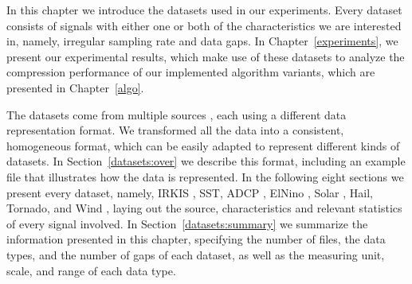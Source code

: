 







In this chapter we introduce the datasets used in our experiments. Every dataset consists of signals with either one or both of the characteristics we are interested in, namely, irregular sampling rate and data gaps. In Chapter~\ref{experiments}, we present our experimental results, which make use of these datasets to analyze the compression performance of our implemented algorithm variants, which are presented in Chapter~\ref{algo}.


The datasets come from multiple sources \dataCite, each using a different data representation format. We transformed all the data into a consistent, homogeneous format, which can be easily adapted to represent different kinds of datasets. In Section~\ref{datasets:over} we describe this format, including an example file that illustrates how the data is represented. In the following eight sections we present every dataset, namely, IRKIS \cite{dataset:irkis}, SST, ADCP \cite{dataset:sst1}, ElNino \cite{dataset:elnino}, Solar \cite{dataset:solar}, Hail, Tornado, and Wind \cite{dataset:spc}, laying out the source, characteristics and relevant statistics of every signal involved. In Section~\ref{datasets:summary} we summarize the information presented in this chapter, specifying the number of files, the data types, and the number of gaps of each dataset, as well as the measuring unit, scale, and range of each data type.

